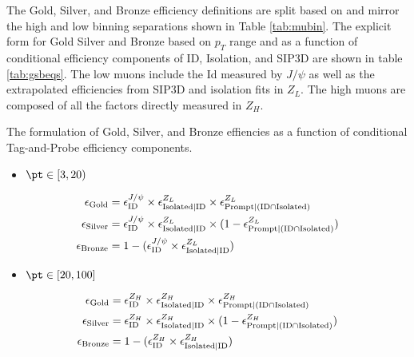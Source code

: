  The Gold, Silver, and Bronze efficiency definitions are split based on \pt and mirror the high and low binning separations shown in Table \ref{tab:mubin}. The explicit form for Gold Silver and Bronze based on $p_T$ range and as a function of conditional efficiency components of ID, Isolation, and SIP3D are shown in table \ref{tab:gsbeqs}. The low \pt muons include the Id measured by $J/\psi$ as well as the extrapolated efficiencies from SIP3D and isolation fits in $Z_{L}$. The high \pt muons are composed of all the factors directly measured in $Z_H$.
\begin{table}
\caption{The formulation of Gold, Silver, and Bronze effiencies as a function of conditional Tag-and-Probe efficiency components.} 
\label{tab:gsbeqs}
\begin{itemize}
\item[] $\pt \in [3,20)$
\end{itemize}
\begin{equation}\label{eq:effcomp_J}
\begin{split}
\epsilon_{\text{Gold}}& = \epsilon_{\text{ID}}^{J/\psi}\times \epsilon_{\text{Isolated}|\text{ID}}^{Z_L} \times \epsilon_{\text{Prompt}|(\text{ID} \cap \text{Isolated})}^{Z_L} \\
\epsilon_{\text{Silver}}& = \epsilon_{\text{ID}}^{J/\psi} \times \epsilon_{\text{Isolated}|\text{ID}}^{Z_L} \times (1-\epsilon_{\text{Prompt}|(\text{ID} \cap \text{Isolated})}^{Z_L}) \\
\epsilon_{\text{Bronze}}& = 1-(\epsilon_{\text{ID}}^{J/\psi} \times \epsilon_{\text{Isolated}|\text{ID}}^{Z_L})
\end{split}
\end{equation}
\begin{itemize}
\item[] $\pt \in [20,100 ]$
\end{itemize}
\begin{equation}\label{eq:effcomp_Z}
\begin{split}
\epsilon_{\text{Gold}}& = \epsilon_{\text{ID}}^{Z_H}\times\epsilon_{\text{Isolated}|\text{ID}}^{Z_H}\times\epsilon_{\text{Prompt}|(\text{ID} \cap \text{Isolated})}^{Z_H} \\
\epsilon_{\text{Silver}}& = \epsilon_{\text{ID}}^{Z_H}\times\epsilon_{\text{Isolated}|\text{ID}}^{Z_H}\times(1-\epsilon_{\text{Prompt}|(\text{ID} \cap \text{Isolated})}^{Z_H})\\
\epsilon_{\text{Bronze}}& = 1-(\epsilon_{\text{ID}}^{Z_H} \times \epsilon_{\text{Isolated}|\text{ID}}^{Z_H})
\end{split}
\end{equation}

\end{table}

